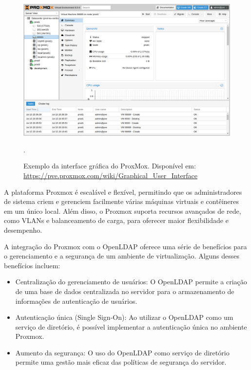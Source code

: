 \begin{figure}[h]
    \centering
	\includegraphics[scale=0.7]{projeto/textuais/gui-qemu-summary.png}
	\caption[Exemplo da interface gráfica do ProxMox]{Exemplo da interface gráfica do ProxMox. Disponível em: \url{https://pve.proxmox.com/wiki/Graphical\_User\_Interface}}.
	\label{fig:interfaceProxMox}
\end{figure}

A plataforma Proxmox é escalável e flexível, permitindo que os administradores de sistema criem e gerenciem facilmente várias máquinas virtuais e contêineres em um único local. Além disso, o Proxmox suporta recursos avançados de rede, como VLANs e balanceamento de carga, para oferecer maior flexibilidade e desempenho.

A integração do Proxmox com o OpenLDAP oferece uma série de benefícios para o gerenciamento e a segurança de um ambiente de virtualização. Alguns desses benefícios incluem:

\begin{itemize}
    \item Centralização do gerenciamento de usuários: O OpenLDAP permite a criação de uma base de dados centralizada no servidor para o armazenamento de informações de autenticação de usuários.
    \item Autenticação única (Single Sign-On): Ao utilizar o OpenLDAP como um serviço de diretório, é possível implementar a autenticação única no ambiente Proxmox.
    \item Aumento da segurança: O uso do OpenLDAP como serviço de diretório permite uma gestão mais eficaz das políticas de segurança do servidor.
\end{itemize}